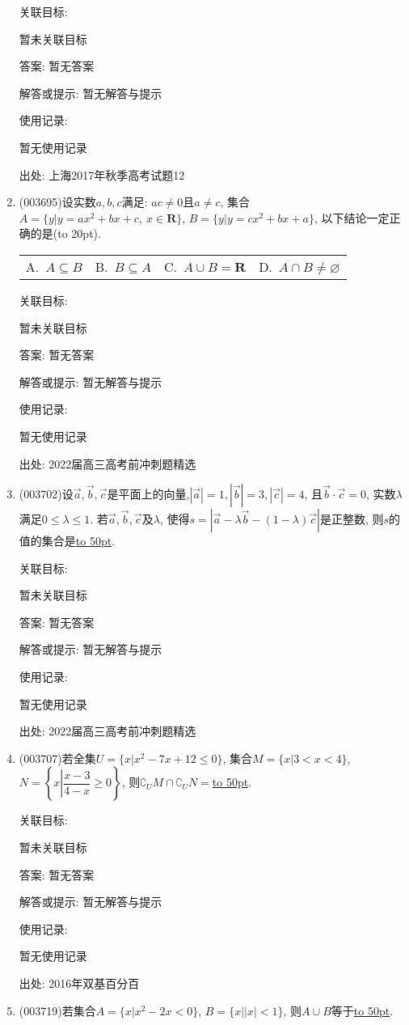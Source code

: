 \documentclass[10pt,a4paper]{article}
\newcommand{\blank}[1]{\underline{\hbox to #1pt{}}}
\newcommand{\bracket}[1]{(\hbox to #1pt{})}
\newcommand{\fourch}[4]{\par\begin{tabular}{p{.23\textwidth}p{.23\textwidth}p{.23\textwidth}p{.23\textwidth}}
A.~#1 &B.~#2& C.~#3& D.~#4
\end{tabular}}
\begin{document}
\begin{enumerate}[1.]
关联目标:

暂未关联目标

答案: 暂无答案

解答或提示: 暂无解答与提示

使用记录:

暂无使用记录


出处: 上海2017年秋季高考试题12
\item { (003695)}设实数$a,b,c$满足: $ac\ne 0$且$a\ne c$, 集合$A=\{y|y=ax^2+bx+c, \ x\in \mathbf{R}\}$, $B=\{y|y=cx^2+bx+a\}$, 以下结论一定正确的是\bracket{20}.
\fourch{$A\subseteq B$}{$B\subseteq A$}{$A\cup B=\mathbf{R}$}{$A\cap B\ne\varnothing$}


关联目标:

暂未关联目标

答案: 暂无答案

解答或提示: 暂无解答与提示

使用记录:

暂无使用记录


出处: 2022届高三高考前冲刺题精选
\item { (003702)}设$\overrightarrow a,\overrightarrow b,\overrightarrow c$是平面上的向量,$|\overrightarrow a| =1,|\overrightarrow b| =3,|\overrightarrow c|=4$, 且$\overrightarrow b\cdot \overrightarrow c=0$, 实数$\lambda$满足$0 \le \lambda \le 1$. 若$\overrightarrow a,\overrightarrow b,\overrightarrow c$及$\lambda$, 使得$s=|\overrightarrow a-\lambda \overrightarrow b-(1-\lambda)\overrightarrow c|$是正整数, 则$s$的值的集合是\blank{50}.


关联目标:

暂未关联目标

答案: 暂无答案

解答或提示: 暂无解答与提示

使用记录:

暂无使用记录


出处: 2022届高三高考前冲刺题精选
\item { (003707)}若全集$U=\{x|x^2-7x+12\le 0\}$, 集合$M=\{x|3<x<4\}$, $N=\left\{x\left|\dfrac{x-3}{4-x}\ge 0\right.\right\}$, 则$\complement_U M\cap \complement_U N=$\blank{50}.


关联目标:

暂未关联目标

答案: 暂无答案

解答或提示: 暂无解答与提示

使用记录:

暂无使用记录


出处: 2016年双基百分百
\item { (003719)}若集合$A=\{x|x^2-2x<0\}$, $B=\{x||x|<1\}$, 则$A\cup B$等于\blank{50}.



\end{enumerate}
\end{document}
